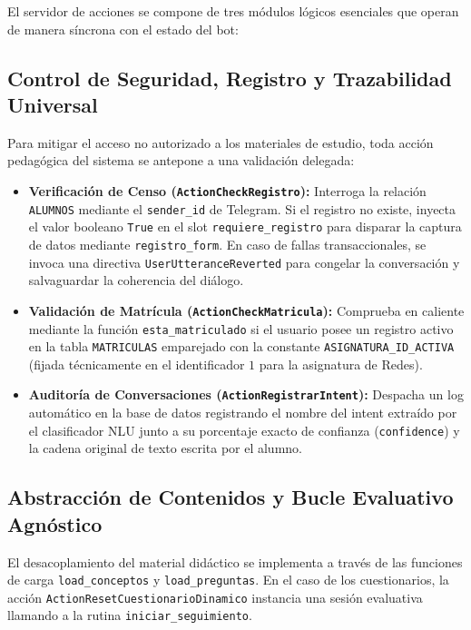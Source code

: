 \documentclass[a4paper,12pt,twoside,final]{book}
\begin{document}
El servidor de acciones se compone de tres módulos lógicos esenciales que operan de manera síncrona con el estado del bot:

\subsection{Control de Seguridad, Registro y Trazabilidad Universal}
Para mitigar el acceso no autorizado a los materiales de estudio, toda acción pedagógica del sistema se antepone a una validación delegada:
\begin{itemize}
    \item \textbf{Verificación de Censo (\texttt{ActionCheckRegistro}):} Interroga la relación \texttt{ALUMNOS} mediante el \texttt{sender\_id} de Telegram. Si el registro no existe, inyecta el valor booleano \texttt{True} en el slot \texttt{requiere\_registro} para disparar la captura de datos mediante \texttt{registro\_form}. En caso de fallas transaccionales, se invoca una directiva \texttt{UserUtteranceReverted} para congelar la conversación y salvaguardar la coherencia del diálogo.
    \item \textbf{Validación de Matrícula (\texttt{ActionCheckMatricula}):} Comprueba en caliente mediante la función \texttt{esta\_matriculado} si el usuario posee un registro activo en la tabla \texttt{MATRICULAS} emparejado con la constante \texttt{ASIGNATURA\_ID\_ACTIVA} (fijada técnicamente en el identificador $1$ para la asignatura de Redes).
    \item \textbf{Auditoría de Conversaciones (\texttt{ActionRegistrarIntent}):} Despacha un log automático en la base de datos registrando el nombre del intent extraído por el clasificador NLU junto a su porcentaje exacto de confianza (\texttt{confidence}) y la cadena original de texto escrita por el alumno.
\end{itemize}

\subsection{Abstracción de Contenidos y Bucle Evaluativo Agnóstico}
El desacoplamiento del material didáctico se implementa a través de las funciones de carga \texttt{load\_conceptos} y \texttt{load\_preguntas}. En el caso de los cuestionarios, la acción \texttt{ActionResetCuestionarioDinamico} instancia una sesión evaluativa llamando a la rutina \texttt{iniciar\_seguimiento}. 
\end{document}
